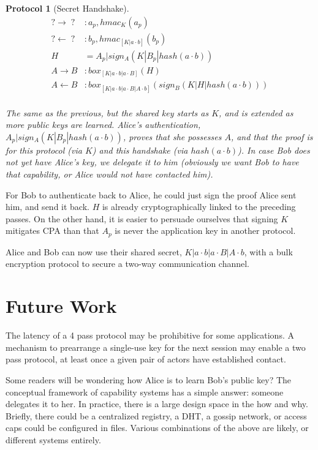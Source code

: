 \documentclass[12pt]{article}
\newtheorem{proto}{Protocol}
\begin{document}
\begin{samepage}
\begin{proto}[Secret Handshake]

  $$
  \begin{align*}
      ? \to \;?\;   &: a_{p}, hmac_{K}(a_{p})   \\
      ? \gets \;?\; &: b_{p}, hmac_{[K|a\cdot b]}(b_{p}) \\
      H&=A_{p}|sign_A(K|B_{p}|hash(a\cdot b)) \\
      A \to B       &: box_{[K|a \cdot b | a \cdot B]}(H)\\
      A \gets B     &:
        box_{[K|a \cdot b | a \cdot B | A \cdot b]}(sign_B(K|H|hash(a\cdot b)) )\\
  \end{align*}
  $$

  The same as the previous, but the shared key starts
  as $K$, and is extended as more public keys are learned.
  Alice's authentication, $A_{p}|sign_A(K|B_p|hash(a\cdot b))$,
  proves that she possesses $A$, and that the proof is for this protocol
  (via $K$) and this handshake (via $hash(a\cdot b)$).
  In case Bob does not yet have Alice's key, we delegate it to him
  (obviously we want Bob to have that capability, or Alice would not have
  contacted him).
\end{proto}
\end{samepage}

For Bob to authenticate back to Alice, he could just sign the proof
Alice sent him, and send it back. $H$ is already cryptographically
linked to the preceding passes. On the other hand, it is easier to
persuade ourselves that signing $K$ mitigates CPA\cite{cpa} than that
$A_p$ is never the application key in another protocol.

Alice and Bob can now use their shared secret,
$K|a \cdot b|a \cdot B|A \cdot b$, with a bulk encryption protocol
to secure a two-way communication channel.

\section{Future Work}

The latency of a 4 pass protocol may be prohibitive for some
applications. A mechanism to prearrange a single-use
key for the next session may enable a two pass protocol, at least
once a given pair of actors have established contact.

Some readers will be wondering how Alice is to learn Bob's public key?
The conceptual framework of capability systems has a simple answer:
someone delegates it to her. In practice, there is a large design space
in the how and why.
Briefly, there could be a centralized registry, a DHT, a gossip network,
or access caps could be configured in files. Various combinations of
the above are likely, or different systems entirely.
\end{document}
